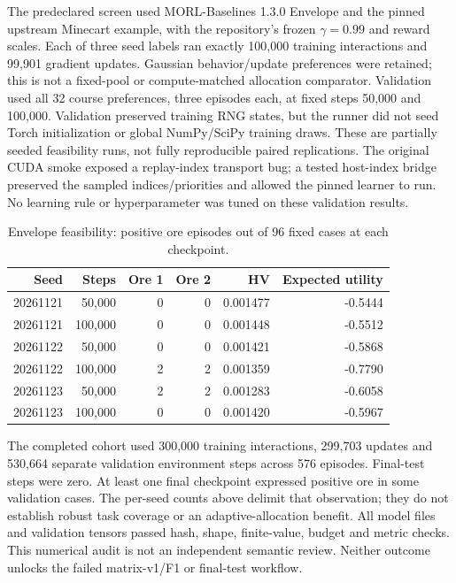 The predeclared screen used MORL-Baselines 1.3.0 Envelope and the pinned
upstream Minecart example, with the repository's frozen $\gamma=0.99$ and reward
scales. Each of three seed labels ran exactly 100,000 training interactions and
99,901 gradient updates. Gaussian behavior/update preferences were retained;
this is not a fixed-pool or compute-matched allocation comparator. Validation
used all 32 course preferences, three episodes each, at fixed steps 50,000 and
100,000. Validation preserved training RNG states, but the runner did not seed
Torch initialization or global NumPy/SciPy training draws. These are partially
seeded feasibility runs, not fully reproducible paired replications. The
original CUDA smoke exposed a replay-index transport bug; a tested host-index
bridge preserved the sampled indices/priorities and allowed the pinned learner
to run. No learning rule or hyperparameter was tuned on these validation results.

\begin{table}[htbp]
\centering\small
\caption{Envelope feasibility: positive ore episodes out of 96 fixed cases at each checkpoint.}
\begin{tabular}{rrrrrr}
\toprule
Seed & Steps & Ore 1 & Ore 2 & HV & Expected utility\\
\midrule
20261121 & 50,000 & 0 & 0 & 0.001477 & -0.5444\\
20261121 & 100,000 & 0 & 0 & 0.001448 & -0.5512\\
20261122 & 50,000 & 0 & 0 & 0.001421 & -0.5868\\
20261122 & 100,000 & 2 & 2 & 0.001359 & -0.7790\\
20261123 & 50,000 & 2 & 2 & 0.001283 & -0.6058\\
20261123 & 100,000 & 0 & 0 & 0.001420 & -0.5967\\
\bottomrule\end{tabular}\end{table}

The completed cohort used 300,000 training interactions, 299,703 updates and 530,664 separate validation environment steps across 576 episodes. Final-test steps were zero. At least one final checkpoint expressed positive ore in some validation cases. The per-seed counts above delimit that observation; they do not establish robust task coverage or an adaptive-allocation benefit. All model files and validation tensors passed hash, shape, finite-value, budget and metric checks. This numerical audit is not an independent semantic review. Neither outcome unlocks the failed matrix-v1/F1 or final-test workflow.
